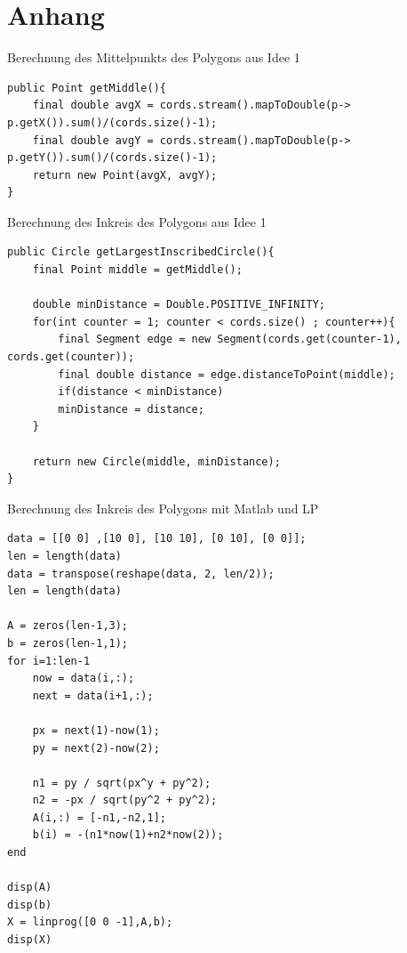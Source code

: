 \documentclass[conference]{IEEEtran}
\begin{document}
	\section{Anhang}
Berechnung des Mittelpunkts des Polygons aus Idee 1
\begin{lstlisting}[basicstyle=\tiny]
public Point getMiddle(){
	final double avgX = cords.stream().mapToDouble(p-> p.getX()).sum()/(cords.size()-1);
	final double avgY = cords.stream().mapToDouble(p-> p.getY()).sum()/(cords.size()-1);
	return new Point(avgX, avgY);
}
\end{lstlisting}
Berechnung des Inkreis des Polygons aus Idee 1
\begin{lstlisting}[basicstyle=\tiny]
public Circle getLargestInscribedCircle(){
	final Point middle = getMiddle();
	
	double minDistance = Double.POSITIVE_INFINITY;
	for(int counter = 1; counter < cords.size() ; counter++){
		final Segment edge = new Segment(cords.get(counter-1), cords.get(counter));
		final double distance = edge.distanceToPoint(middle);
		if(distance < minDistance)
		minDistance = distance;
	}
	
	return new Circle(middle, minDistance);
}
\end{lstlisting} 
	Berechnung des Inkreis des Polygons mit Matlab und LP
\begin{lstlisting}[basicstyle=\tiny]
data = [[0 0] ,[10 0], [10 10], [0 10], [0 0]];
len = length(data)
data = transpose(reshape(data, 2, len/2));
len = length(data)

A = zeros(len-1,3);
b = zeros(len-1,1);
for i=1:len-1
	now = data(i,:);
	next = data(i+1,:);
	
	px = next(1)-now(1);
	py = next(2)-now(2);
	
	n1 = py / sqrt(px^y + py^2);
	n2 = -px / sqrt(py^2 + py^2);
	A(i,:) = [-n1,-n2,1];
	b(i) = -(n1*now(1)+n2*now(2));
end

disp(A)
disp(b)
X = linprog([0 0 -1],A,b);
disp(X)
\end{lstlisting}  
\end{document}
